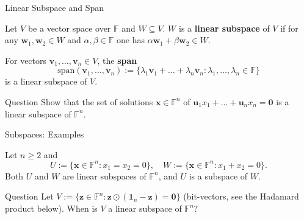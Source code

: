 \documentclass{zkdl-presentation-template}
\begin{document}
    \begin{frame}{Linear Subspace and Span}
        \begin{definition}
            Let $V$ be a vector space over $\mathbb{F}$ and $W \subseteq V$. $W$ is a \textbf{linear subspace} of $V$ if for any $\mathbf{w}_1,\mathbf{w}_2 \in W$ and $\alpha,\beta \in \mathbb{F}$ one has $\alpha\mathbf{w}_1 + \beta\mathbf{w}_2 \in W$.
        \end{definition}
        \pause

        \begin{example}
            For vectors $\mathbf{v}_1,\dots,\mathbf{v}_n \in V$, the \textbf{span}
            \begin{equation*}
                \text{span}(\mathbf{v}_1,\dots,\mathbf{v}_n) := \{\lambda_1\mathbf{v}_1 + \dots + \lambda_n\mathbf{v}_n: \lambda_1,\dots,\lambda_n \in \mathbb{F}\}
            \end{equation*}
            is a linear subspace of $V$.
        \end{example}
        \pause

        \begin{questionblock}{Question}
            Show that the set of solutions $\mathbf{x} \in \mathbb{F}^n$ of $\mathbf{u}_1x_1 + \dots + \mathbf{u}_nx_n = \mathbf{0}$ is a linear subspace of $\mathbb{F}^n$.
        \end{questionblock}
    \end{frame}

    \begin{frame}{Subspaces: Examples}
        \begin{example}
            Let $n \geq 2$ and
            \begin{equation*}
                U := \{\mathbf{x} \in \mathbb{F}^n: x_1 = x_2 = 0\}, \quad W := \{\mathbf{x} \in \mathbb{F}^n: x_1 + x_2 = 0\}.
            \end{equation*}
            Both $U$ and $W$ are linear subspaces of $\mathbb{F}^n$, and $U$ is a subspace of $W$.
        \end{example}
        \pause

        \begin{questionblock}{Question}
            Let $V := \{\mathbf{z} \in \mathbb{F}^n: \mathbf{z} \odot (\mathbf{1}_n - \mathbf{z}) = \mathbf{0}\}$ (bit-vectors, see the Hadamard product below). When is $V$ a linear subspace of $\mathbb{F}^n$?
        \end{questionblock}
    \end{frame}
\end{document}
